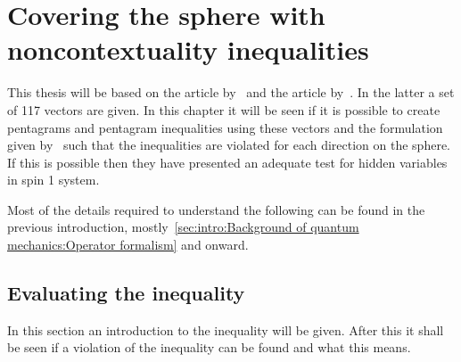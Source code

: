 \chapter{Covering the sphere with noncontextuality inequalities}\label{cha:Covering the sphere with noncontextuality inequalities}
This thesis will be based on the article by~\cite{PhysRevLett.101.020403} and the article by~\cite{Kochen1968The}. In the latter a set of 117 vectors are given. In this chapter it will be seen if it is possible to create pentagrams and pentagram inequalities using these vectors and the formulation given by~\cite{PhysRevLett.101.020403} such that the inequalities are violated for each direction on the sphere. 
If this is possible then they have presented an adequate test for hidden variables in spin 1 system.

Most of the details required to understand the following can be found in the previous introduction, mostly~\ref{sec:intro:Background of quantum mechanics:Operator formalism} and onward.
 
\newpage
\section{Evaluating the inequality}\label{sec:Covering the sphere with noncontextuality inequalities:Evaluating the inequality}
In this section an introduction to the inequality will be given. After this it shall be seen if a violation of the inequality can be found and what this means. 
